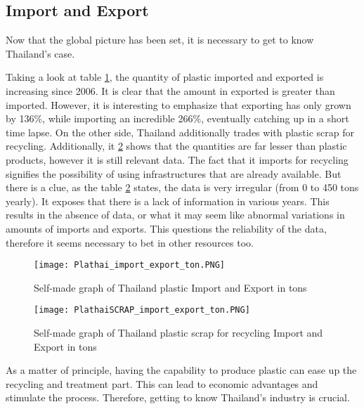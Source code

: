 \documentclass[twoside,a4paper,12pt]{report}
\begin{document}


\subsection{Import and Export}
Now that the global picture has been set, it is necessary to get to know Thailand's case.

Taking a look at table \ref{fig:Thai_impexp_tons}, the quantity of plastic imported and exported is increasing since 2006. It is clear that the amount in exported is greater than imported. However, it is interesting to emphasize that exporting has only grown by 136\%, while importing an incredible 266\%, eventually catching up in a short time lapse. On the other side, Thailand additionally trades with plastic scrap for recycling. Additionally, it \ref{fig:Thai_impexp_scraptons} shows that the quantities are far lesser than plastic products, however it is still relevant data. The fact that it imports for recycling signifies the possibility of using infrastructures that are already available. But there is a clue, as the table \ref{fig:Thai_impexp_scraptons} states, the data is very irregular (from 0 to 450 tons yearly). It exposes that there is a lack of information in various years. This results in the absence of data, or what it may seem like abnormal variations in amounts of imports and exports. This questions the reliability of the data, therefore it seems necessary to bet in other resources too.


\begin{figure}
    \centering
    \texttt{[image: Plathai\_import\_export\_ton.PNG]}
    \caption{Self-made graph of Thailand plastic Import and Export in tons}\cite{PUI}
     \label{fig:Thai_impexp_tons}
\end{figure}

\begin{figure}
    \centering
    \texttt{[image: PlathaiSCRAP\_import\_export\_ton.PNG]}
    \caption{Self-made graph of Thailand plastic scrap for recycling Import and Export in tons \cite{PUI}}
     \label{fig:Thai_impexp_scraptons}
\end{figure}
As a matter of principle, having the capability to produce plastic can ease up the recycling and treatment part. This can lead to economic advantages and stimulate the process. Therefore, getting to know Thailand's industry is crucial. 
\end{document}
